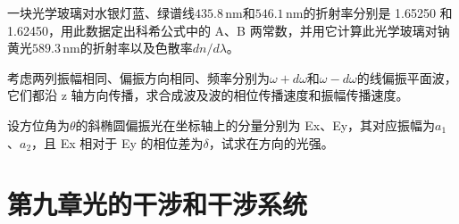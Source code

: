 \documentclass[standard, analysis, notocnum]{ExBook}
\newcommand{\answerarea}[1][8cm]{%
  \par\vspace{2mm}%
  \noindent{\color{themeColor!35}\rule{\linewidth}{0.4pt}}\par
  \noindent\begin{minipage}[t][#1][t]{\linewidth}\vspace{0pt}\end{minipage}\par
  \noindent{\color{themeColor!35}\rule{\linewidth}{0.4pt}}\par
}
\begin{document}
\begin{qitems}[startnum=8]
\qitem 一块光学玻璃对水银灯蓝、绿谱线$435.8\,\mathrm{nm}$和$546.1\,\mathrm{nm}$的折射率分别是 1.65250 和1.62450，用此数据定出科希公式中的 A、B 两常数，并用它计算此光学玻璃对钠黄光$589.3\,\mathrm{nm}$的折射率以及色散率$dn/d\lambda$。
\label{q:174:start}
\answerarea[8cm]
\label{q:174:end}
\end{qitems}

\begin{qitems}[startnum=9]
\qitem 考虑两列振幅相同、偏振方向相同、频率分别为$\omega +d\omega$和$\omega -d\omega$的线偏振平面波，它们都沿 z 轴方向传播，求合成波及波的相位传播速度和振幅传播速度。
\label{q:175:start}
\answerarea[8cm]
\label{q:175:end}
\end{qitems}

\begin{qitems}[startnum=10]
\qitem 设方位角为$\theta$的斜椭圆偏振光在坐标轴上的分量分别为 Ex、Ey，其对应振幅为$a_{1}$、$a_{2}$，且 Ex 相对于 Ey 的相位差为$\delta$，试求在方向的光强。
\label{q:176:start}
\answerarea[8cm]
\label{q:176:end}
\end{qitems}

\section{第九章\quad 光的干涉和干涉系统}
\end{document}
